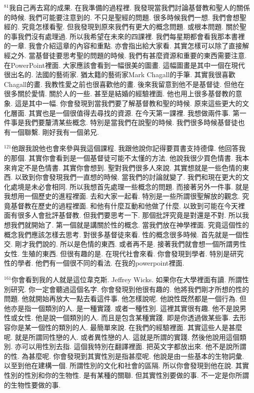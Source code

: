 \documentclass{book}
\begin{document}
$^{81}$我自己再去寫的成果.
在我準備的過程裡.
我發現當我們討論基督教和聖人的關係的時候.
我們可能要注意到的.
不只是聖經的問題.
很多時候我們一想.
我們會想聖經的.
究竟怎樣看聖.
但我發現到原來我們有更大的概念問題.
或根本問題.
關於聖的事我們沒有處理過.
所以我希望在未來的四課裡.
我們每星期都會看我那本書裡的一章.
我會介紹這章的內容和重點.
亦會指出給大家看.
其實怎樣可以除了直接解經之外.
當基督徒要思考聖的問題的時候.
我們有甚麼資源和重要的東西需要注意.
在PowerPoint裡面.
大家應該會看到一幅很美的圖畫.
這幅圖畫是其中一個在現代很出名的.
法國的藝術家.
猶太籍的藝術家Mark Chagall的手筆.
其實我很喜歡Chagall的畫.
我教性愛之前也很喜歡他的畫.
後來我留意到他不是基督徒.
但他在很多關於愛情.
關於人的一些.
甚至是結婚的經驗裡面.
他也用上很多基督教的意象.
這是其中一幅.
你會發現到當我們要了解基督教和聖的時候.
原來這些更大的文化層面.
其實也是一個很值得去尋找的資源.
在今天第一課裡.
我想做兩件事.
第一件事是我們要釐清某些概念.
特別是當我們在說聖的時候.
我們很多時候基督徒也有一個聯繫.
剛好我有一個弟兄.

$^{121}$他跟我說他也會來參與我這個課程.
我跟他說你記得要買書支持德偉.
他回答我的那個.
其實你會看到是一個基督徒可能不太懂的方法.
他說我很少買色情書.
我本來肯定不是色情書.
其實你會想到.
聖對我們很多人來說.
其實想就是一些色情的東西.
以致到你會發現我們一直想的時候.
當我們的討論就變了.
我們和現在更大的文化處境是未必會相同.
所以我想首先處理一些概念的問題.
而接著另外一件事.
就是我想用一個歷史的進程裡面.
去和大家一起看.
特別是一些所謂很聖解放的觀念.
究竟基督教在歷史的過程裡面.
和他有什麼互動和他做了什麼.
以致到可能在今天裡面有很多人會批評基督教.
但我們要思考一下.
那個批評究竟是對還是不對.
所以我想我們就開始了.
第一個就是講關於性的概念.
當我們放在神學裡面.
究竟這個性的概念我們應該怎樣去思考.
對很多基督徒來看.
性的概念很多時候.
首先就是一個性交.
剛才我們說的.
所以是色情的東西.
或者再不是.
接著我們就會想一個所謂男性女性.
生殖的東西.
但很有趣的是.
在現代社會來看.
你會發現到學者.
特別是研究性的學者.
他們有一個很不同的看法.
在我的powerpoint裡面.

$^{161}$你會看到我的人就是這位韋克斯.
Jeffrey Wicks.
如果你在大學裡面有讀.
所謂性別研究.
你一定會聽過這個名字.
你會發現到他很有趣的.
他將我們剛才所想的性的問題.
他就開始再放大一點去看這件事.
他怎樣說呢.
他說性既然都是一個行為.
但他亦是指一個類別的人.
是一種實踐.
或者一種性別.
這裡其實很有趣.
他不是說男性或女性.
他是說一個類別的人.
而且是包含某種實踐.
即是你透過做某些事.
去形容你是某一個性的類別的人.
最簡單來說.
在我們的經驗裡面.
其實這些人是甚麼呢.
就是所謂同性戀的人.
或者異性戀的人.
這就是所謂的實踐.
然後他說用這個類別.
亦可以用性別去指.
這個我特別在翻譯裡面.
把英文字都放出來.
他不是說所謂的性.
為甚麼呢.
你會發現到其實性別是指甚麼呢.
他說是由一些基本的生物詞彙.
以至到他在建構一個.
所謂性別的文化和社會的區隔.
所以你會發現到他在說.
其實性別的性別和你的生物性.
是有某種的關聯.
但其實性別要做的事.
不一定是你所謂的生物性要做的事.
\end{document}
